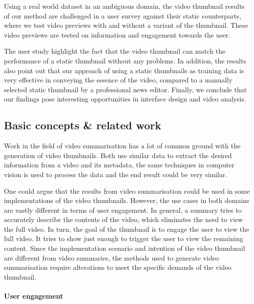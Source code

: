 \documentclass{../resources/sig-alternate-05-2015}
\begin{document}
Using a real world dataset in an ambiguous domain, the video thumbnail results of our method are challenged in a user survey against their static counterparts, where we test video previews with and without a variant of the thumbnail. These video previews are tested on information and engagement towards the user.

The user study highlight the fact that the video thumbnail can match the performance of a static thumbnail without any problems. In addition, the results also point out that our approach of using a static thumbnails as training data is very effective in conveying the essence of the video, compared to a manually selected static thumbnail by a professional news editor. Finally, we conclude that our findings pose interesting opportunities in interface design and video analysis.

\subsection{Basic concepts \& related work}

\label{related work}

Work in the field of video summarisation has a lot of common ground with the generation of video thumbnails. Both use similar data to extract the desired information from a video and its metadata, the same techniques in computer vision is used to process the data and the end result could be very similar. 

One could argue that the results from video summarisation could be used in some implementations of the video thumbnails. However, the use cases in both domains are vastly different in terms of user engagement. In general, a summary tries to accurately describe the contents of the video, which eliminates the need to view the full video. In turn, the goal of the thumbnail is to engage the user to view the full video. It tries to show just enough to trigger the user to view the remaining content. Since the implementation scenario and intention of the video thumbnail are different from video summaries, the methods used to generate video summarisation require alterations to meet the specific demands of the video thumbnail.

\paragraph{User engagement}
\label{section: user engagement}
\end{document}

